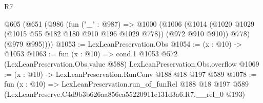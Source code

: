 \begin{lexlean}{R7}
\begin{coremodule}
  @605
    (@651
      (@986
        (fun ("_" : @987) =>
        @1000
          (@1006
            (@1014 (@1020 @1029 (@1015 @55 @182 @180 @910 @196 @1029 @778)) (@972 @910 @910))
            @778)
          (@979 @995))))
@1053 := LexLeanPreservation.Obs
@1054 := (x : @10) -> @1053
@1063 := fun (x : @10) =>
  cond.{1} @1053 @572 (LexLeanPreservation.Obs.value @588) LexLeanPreservation.Obs.overflow
@1069 := (x : @10) -> LexLeanPreservation.RunConv @188 @18 @197 @589
@1078 := fun (x : @10) =>
  LexLeanPreservation.run_of_funRel
    @188
    @18
    @197
    @589
    (LexLeanPreserve.C4d9b3b626aa856ea55220911e131d3a6.R7.__rel_0 @193)
\end{coremodule}
\end{lexlean}
